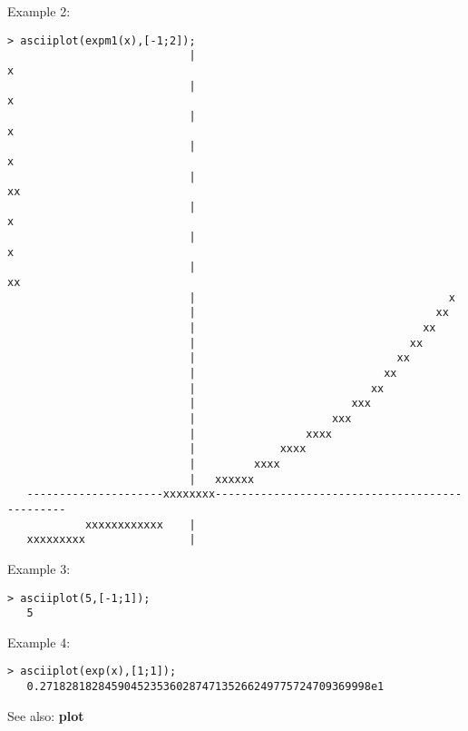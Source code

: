 \noindent Example 2: 
\begin{center}\begin{minipage}{14.8cm}\begin{Verbatim}[frame=single]
   > asciiplot(expm1(x),[-1;2]);
                            |                                                 x
                            |                                                x 
                            |                                               x  
                            |                                              x   
                            |                                            xx    
                            |                                           x      
                            |                                          x       
                            |                                        xx        
                            |                                       x          
                            |                                     xx           
                            |                                   xx             
                            |                                 xx               
                            |                               xx                 
                            |                             xx                   
                            |                           xx                     
                            |                        xxx                       
                            |                     xxx                          
                            |                 xxxx                             
                            |             xxxx                                 
                            |         xxxx                                     
                            |   xxxxxx                                         
   ---------------------xxxxxxxx-----------------------------------------------
            xxxxxxxxxxxx    |                                                  
   xxxxxxxxx                |                                                  
\end{Verbatim}
\end{minipage}\end{center}
\noindent Example 3: 
\begin{center}\begin{minipage}{14.8cm}\begin{Verbatim}[frame=single]
   > asciiplot(5,[-1;1]);
   5
\end{Verbatim}
\end{minipage}\end{center}
\noindent Example 4: 
\begin{center}\begin{minipage}{14.8cm}\begin{Verbatim}[frame=single]
   > asciiplot(exp(x),[1;1]);
   0.271828182845904523536028747135266249775724709369998e1
\end{Verbatim}
\end{minipage}\end{center}
See also: \textbf{plot}
